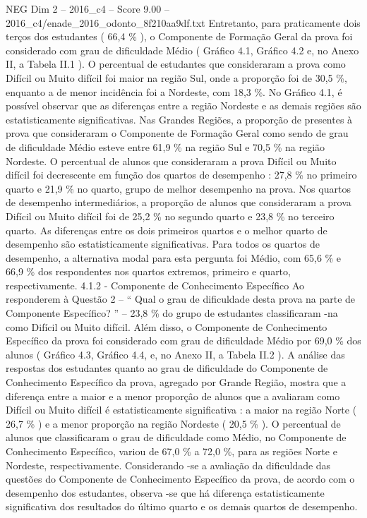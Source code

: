 \begin{textsample}{NEG Dim 2 – 2016\_c4 – Score 9.00 – 2016\_c4/enade\_2016\_odonto\_8f210aa9df.txt}
Entretanto, para praticamente dois terços dos estudantes ( 66,4 \% ), o Componente de Formação Geral da prova foi considerado com grau de dificuldade Médio ( Gráfico 4.1, Gráfico 4.2 e, no Anexo II, a Tabela II.1 ).
O percentual de estudantes que consideraram a prova como Difícil ou Muito difícil foi maior na região Sul, onde a proporção foi de 30,5 \%, enquanto a de menor incidência foi a Nordeste, com 18,3 \%.
No Gráfico 4.1, é possível observar que as diferenças entre a região Nordeste e as demais regiões são estatisticamente significativas.
Nas Grandes Regiões, a proporção de presentes à prova que consideraram o Componente de Formação Geral como sendo de grau de dificuldade Médio esteve entre 61,9 \% na região Sul e 70,5 \% na região Nordeste.
O percentual de alunos que consideraram a prova Difícil ou Muito difícil foi decrescente em função dos quartos de desempenho : 27,8 \% no primeiro quarto e 21,9 \% no quarto, grupo de melhor desempenho na prova.
Nos quartos de desempenho intermediários, a proporção de alunos que consideraram a prova Difícil ou Muito difícil foi de 25,2 \% no segundo quarto e 23,8 \% no terceiro quarto.
As diferenças entre os dois primeiros quartos e o melhor quarto de desempenho são estatisticamente significativas.
Para todos os quartos de desempenho, a alternativa modal para esta pergunta foi Médio, com 65,6 \% e 66,9 \% dos respondentes nos quartos extremos, primeiro e quarto, respectivamente. 4.1.2 - Componente de Conhecimento Específico Ao responderem à Questão 2 – “ Qual o grau de dificuldade desta prova na parte de Componente Específico? ” – 23,8 \% do grupo de estudantes classificaram -na como Difícil ou Muito difícil.
Além disso, o Componente de Conhecimento Específico da prova foi considerado com grau de dificuldade Médio por 69,0 \% dos alunos ( Gráfico 4.3, Gráfico 4.4, e, no Anexo II, a Tabela II.2 ).
A análise das respostas dos estudantes quanto ao grau de dificuldade do Componente de Conhecimento Específico da prova, agregado por Grande Região, mostra que a diferença entre a maior e a menor proporçâo de alunos que a avaliaram como Difícil ou Muito difícil é estatisticamente significativa : a maior na região Norte ( 26,7 \% ) e a menor proporção na região Nordeste ( 20,5 \% ).
O percentual de alunos que classificaram o grau de dificuldade como Médio, no Componente de Conhecimento Específico, variou de 67,0 \% a 72,0 \%, para as regiões Norte e Nordeste, respectivamente.
Considerando -se a avaliação da dificuldade das questões do Componente de Conhecimento Específico da prova, de acordo com o desempenho dos estudantes, observa -se que há diferença estatisticamente significativa dos resultados do último quarto e os demais quartos de desempenho.

\end{textsample}
